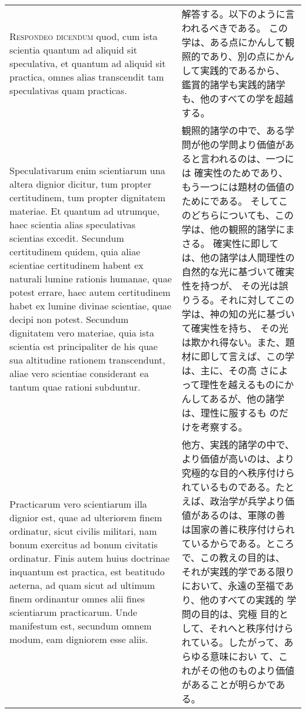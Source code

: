 \documentclass[10pt]{jsarticle} %
\begin{document}
\begin{longtable}{p{21em}p{21em}}
\\


{\scshape Respondeo dicendum} quod, cum ista scientia
quantum ad aliquid sit speculativa, et quantum ad aliquid sit practica,
omnes alias transcendit tam speculativas quam practicas. 

&

解答する。以下のように言われるべきである。
この学は、ある点にかんして観照的であり、別の点にかんして実践的であるから、
鑑賞的諸学も実践的諸学も、他のすべての学を超越する。


\\


Speculativarum
enim scientiarum una altera dignior dicitur, tum propter certitudinem,
tum propter dignitatem materiae. 
Et quantum ad utrumque, haec scientia
alias speculativas scientias excedit. Secundum certitudinem quidem, quia
aliae scientiae certitudinem habent ex naturali lumine rationis humanae,
quae potest errare, haec autem certitudinem habet ex lumine divinae
scientiae, quae decipi non potest. Secundum dignitatem vero materiae,
quia ista scientia est principaliter de his quae sua altitudine rationem
transcendunt, aliae vero scientiae considerant ea tantum quae rationi
subduntur. 



&


観照的諸学の中で、ある学問が他の学問より価値があると言われるのは、一つには
 確実性のためであり、もう一つには題材の価値のためにである。
そしてこのどちらについても、この学は、他の観照的諸学にまさる。
確実性に即しては、他の諸学は人間理性の自然的な光に基づいて確実性を持つが、
その光は誤りうる。それに対してこの学は、神の知の光に基づいて確実性を持ち、
 その光は欺かれ得ない。また、題材に即して言えば、この学は、主に、その高
 さによって理性を越えるものにかんしてあるが、他の諸学は、理性に服するも
 のだけを考察する。

\\


Practicarum vero scientiarum illa dignior est, quae ad
ulteriorem finem ordinatur, sicut civilis militari, nam bonum exercitus
ad bonum civitatis ordinatur. Finis autem huius doctrinae inquantum est
practica, est beatitudo aeterna, ad quam sicut ad ultimum finem
ordinantur omnes alii fines scientiarum practicarum. Unde manifestum
est, secundum omnem modum, eam digniorem esse aliis.


&

他方、実践的諸学の中で、より価値が高いのは、より究極的な目的へ秩序付けら
 れているものである。たとえば、政治学が兵学より価値があるのは、軍隊の善
 は国家の善に秩序付けられているからである。ところで、この教えの目的は、
 それが実践的学である限りにおいて、永遠の至福であり、他のすべての実践的
 学問の目的は、究極
 目的として、それへと秩序付けられている。したがって、あらゆる意味におい
 て、これがその他のものより価値があることが明らかである。



\end{longtable}
\end{document}
